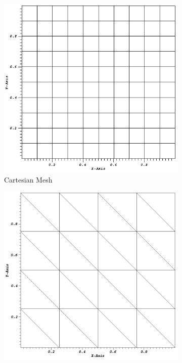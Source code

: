 \documentclass{anstrans}
\begin{document}

\begin{figure}[]
\centering
\begin{subfigure}{.5\textwidth}
	\centering
	\includegraphics[scale=0.48]{cart_mesh.jpg}
	\caption{Cartesian Mesh}
	\label{fig::cart_mesh}
\end{subfigure}
\begin{subfigure}{.5\textwidth}
	\centering
	\includegraphics[scale=0.283]{visit0008.jpg}

\end{subfigure}
\end{figure}
\end{document}
